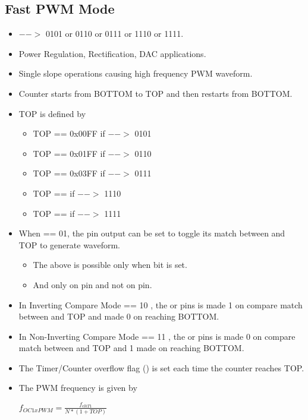 \documentclass{article}
\begin{document}
\subsection{Fast PWM Mode}
\begin{itemize}
    \item {} $-->$ 0101 or 0110 or 0111 or 1110 or 1111.
    \item Power Regulation, Rectification, DAC applications.
    \item Single slope operations causing high frequency PWM waveform.
    \item Counter starts from BOTTOM to TOP and then restarts from BOTTOM.
    \item TOP is defined by
    \begin{itemize}
        \item TOP == 0x00FF if  $-->$ 0101
        \item TOP == 0x01FF if  $-->$ 0110
        \item TOP == 0x03FF if  $-->$ 0111
        \item TOP ==    if  $-->$ 1110
        \item TOP ==   if  $-->$ 1111
    \end{itemize}
    \item  When  == 01, the  pin output can be set to toggle its match between  and TOP to generate waveform.
    \begin{itemize}
        \item The above is possible only when  bit is set.
        \item And only on  pin and not on  pin.
    \end{itemize}
    \item In Inverting Compare Mode  == 10 , the  or  pins is made 1 on compare match between  and TOP and made 0 on reaching BOTTOM.
    \item In Non-Inverting Compare Mode  == 11 , the  or  pins is made 0 on compare match between  and TOP and 1 made  on reaching BOTTOM.
    \item The Timer/Counter overflow flag () is set each time the counter reaches TOP.
    \item The PWM frequency is given by 
    \begin{center}
        { \Large $f_{OC1xPWM} = \frac{f_{clkT1}}{N * (1+ TOP)}$ }
    \end{center}
\end{itemize}
\end{document}
